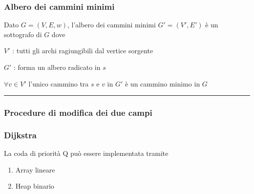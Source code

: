 \documentclass{article}
\providecommand{\tightlist}{%
  \setlength{\itemsep}{0pt}\setlength{\parskip}{0pt}}
\begin{document}
{{{\subsubsection{\texorpdfstring{{Albero dei cammini minimi}}{Albero dei cammini minimi}}\label{h.2lffyamho46s}

{Dato $G=(V,E,w)$, l'albero dei cammini minimi $G'=(V',E')$ è un sottografo di $G$ dove}

{$V'$ : tutti gli archi ragiungibili dal vertice sorgente}

{$G'$ : forma un albero radicato in $s$}

{$\forall v \in V'$ l'unico cammino tra $s$ e $v$ in $G'$ è un cammino minimo in $G$}

\begin{center}\rule{0.5\linewidth}{\linethickness}\end{center}

\subsubsection{\texorpdfstring{{}}{}}\label{h.h4dk3zmkq25w}

\subsubsection{\texorpdfstring{{Procedure di modifica dei due campi}}{Procedure di modifica dei due campi}}\label{h.5lg4kz3z4f5y}

\protect\hypertarget{t.29f77ac6905498186484b14fa7bf14ea64fecb79}{}{}\protect\hypertarget{t.46}{}{}



\protect\hypertarget{t.4fa4368bfb7c1d485140ed33f86edf6c298bfda0}{}{}\protect\hypertarget{t.47}{}{}



\subsubsection{\texorpdfstring{{Dijkstra}}{Dijkstra}}\label{h.d7e75pwi333b}

\protect\hypertarget{t.d055ffe7c1698902badd9b7488033a931b1cfb1d}{}{}\protect\hypertarget{t.48}{}{}




{La coda di priorità Q può essere implementata tramite}

\begin{enumerate}
\tightlist
\item
  {Array lineare}
\item
  {Heap binario}
\end{enumerate}

}}}
\end{document}
